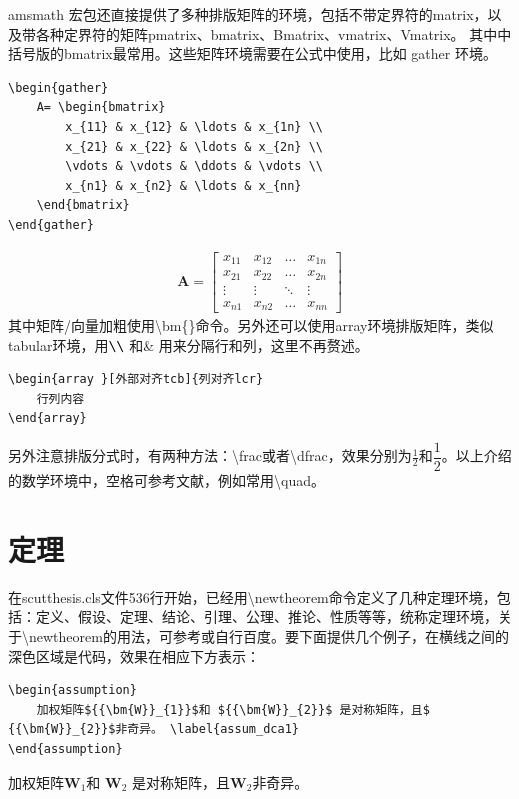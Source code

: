 amsmath 宏包还直接提供了多种排版矩阵的环境，包括不带定界符的matrix，以及带各种定界符的矩阵pmatrix、bmatrix、Bmatrix、vmatrix、Vmatrix。
其中中括号版的bmatrix最常用。这些矩阵环境需要在公式中使用，比如 gather 环境。
\begin{lstlisting}
\begin{gather}
	A= \begin{bmatrix}
		x_{11} & x_{12} & \ldots & x_{1n} \\
		x_{21} & x_{22} & \ldots & x_{2n} \\
		\vdots & \vdots & \ddots & \vdots \\
		x_{n1} & x_{n2} & \ldots & x_{nn}
	\end{bmatrix}
\end{gather}
\end{lstlisting}
\begin{gather}
\bm{A}= \begin{bmatrix}
	x_{11} & x_{12} & \ldots & x_{1n} \\
	x_{21} & x_{22} & \ldots & x_{2n} \\
	\vdots & \vdots & \ddots & \vdots \\
	x_{n1} & x_{n2} & \ldots & x_{nn}
   \end{bmatrix}
\end{gather}	
其中矩阵/向量加粗使用\textbackslash{}bm\{\}命令。另外还可以使用array环境排版矩阵，类似tabular环境，用$ \verb|\\|$ 和\& 用来分隔行和列，这里不再赘述。	
\begin{lstlisting}
\begin{array }[外部对齐tcb]{列对齐lcr}
	行列内容
\end{array}
\end{lstlisting}

另外注意排版分式时，有两种方法：\textbackslash{}frac或者\textbackslash{}dfrac，效果分别为$ \frac{1}{2} $和$ \dfrac{1}{2} $。以上介绍的数学环境中，空格可参考文献\parencite{_c}，例如常用\textbackslash{}quad。
\section{定理}
在scutthesis.cls文件536行开始，已经用\textbackslash{}newtheorem命令定义了几种定理环境，包括：定义、假设、定理、结论、引理、公理、推论、性质等等，统称定理环境，关于\textbackslash{}newtheorem的用法，可参考\cite{_c}或自行百度。要下面提供几个例子，在横线之间的深色区域是代码，效果在相应下方表示：
\begin{lstlisting}
\begin{assumption}
	加权矩阵${{\bm{W}}_{1}}$和 ${{\bm{W}}_{2}}$ 是对称矩阵，且$ {{\bm{W}}_{2}}$非奇异。	\label{assum_dca1}
\end{assumption}
\end{lstlisting}
\begin{assumption}
	加权矩阵${{\bm{W}}_{1}}$和 ${{\bm{W}}_{2}}$ 是对称矩阵，且$ {{\bm{W}}_{2}}$非奇异。	\label{assum_dca1}
\end{assumption}

